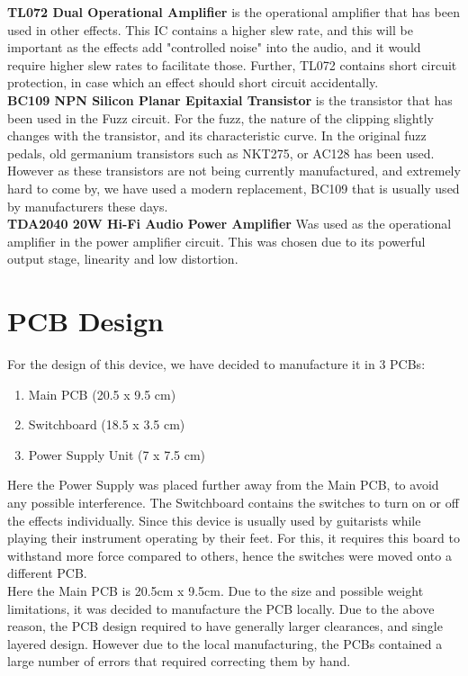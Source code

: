 \documentclass{article}
\begin{document}
            \textbf{TL072 Dual Operational Amplifier} is the operational amplifier that has been used in other effects. This IC contains a higher slew rate, and this will be important as the effects add "controlled noise" into the audio, and it would require higher slew rates to facilitate those. Further, TL072 contains short circuit protection, in case which an effect should short circuit accidentally.\\

            \textbf{BC109 NPN Silicon Planar Epitaxial Transistor} is the transistor that has been used in the Fuzz circuit. For the fuzz, the nature of the clipping slightly changes with the transistor, and its characteristic curve. In the original fuzz pedals, old germanium transistors such as NKT275, or AC128 has been used. However as these transistors are not being currently manufactured, and extremely hard to come by, we have used a modern replacement, BC109 that is usually used by manufacturers these days.\\

            \textbf{TDA2040 20W Hi-Fi Audio Power Amplifier} Was used as the operational amplifier in the power amplifier circuit. This was chosen due to its powerful output stage, linearity and low distortion.
            
	\section{PCB Design}
            For the design of this device, we have decided to manufacture it in 3 PCBs:
            \begin{enumerate}
                \item Main PCB (20.5 x 9.5 cm)
                \item Switchboard (18.5 x 3.5 cm)
                \item Power Supply Unit (7 x 7.5 cm)
            \end{enumerate}

            Here the Power Supply was placed further away from the Main PCB, to avoid any possible interference. The Switchboard contains the switches to turn on or off the effects individually. Since this device is usually used by guitarists while playing their instrument operating by their feet. For this, it requires this board to withstand more force compared to others, hence the switches were moved onto a different PCB. \\

            Here the Main PCB is 20.5cm x 9.5cm. Due to the size and possible weight limitations, it was decided to manufacture the PCB locally. Due to the above reason, the PCB design required to have generally larger clearances, and single layered design. However due to the local manufacturing, the PCBs contained a large number of errors that required correcting them by hand.\\
\end{document}
